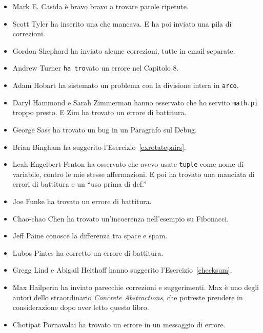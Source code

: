 \documentclass[10pt]{book}
\begin{document}
\begin{itemize}
\item Mark E. Casida è bravo bravo a trovare parole ripetute.

\item Scott Tyler ha inserito una che mancava. E ha poi inviato una pila di correzioni.

\item Gordon Shephard ha inviato alcune correzioni, tutte in email separate.

\item Andrew Turner {\tt ha tro}vato un errore nel Capitolo 8.

\item Adam Hobart ha sistemato un problema con la divisione intera in
{\tt arco}.

\item Daryl Hammond e Sarah Zimmerman hanno osservato che ho servito {\tt math.pi} troppo presto. E Zim ha trovato un errore di battitura.

\item George Sass ha trovato un bug in un Paragrafo sul Debug.

\item Brian Bingham ha suggerito l'Esercizio~\ref{exrotatepairs}.

\item Leah Engelbert-Fenton ha osservato che avevo usate {\tt tuple}
come nome di variabile, contro le mie stesse affermazioni. E poi ha trovato una manciata di errori di battitura e un ``uso prima di def.''

\item Joe Funke ha trovato un errore di battitura.

\item Chao-chao Chen ha trovato un'incoerenza nell'esempio su Fibonacci.

\item Jeff Paine conosce la differenza tra space e spam.

\item Lubos Pintes ha corretto un errore di battitura.

\item Gregg Lind e Abigail Heithoff hanno suggerito l'Esercizio~\ref{checksum}.

\item Max Hailperin ha inviato parecchie correzioni e suggerimenti.  Max è uno degli autori dello straordinario {\em Concrete Abstractions}, che potreste prendere in considerazione dopo aver letto questo libro.

\item Chotipat Pornavalai ha trovato un errore in un messaggio di errore.


\end{itemize}
\end{document}
